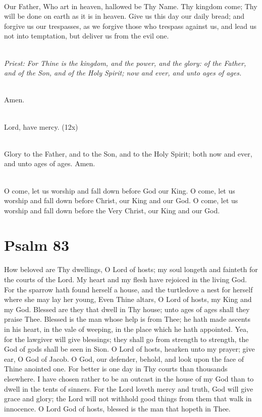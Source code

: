 {\mbox{}\\
Our Father, Who art in heaven, hallowed be Thy Name. Thy kingdom come; 
Thy will be done on earth as it is in heaven.
Give us this day our daily bread; 
and forgive us our trespasses,
as we forgive those who trespass against us, and 
lead us not into temptation, but deliver us from the evil one. 

\mbox{}\\
\emph{Priest: For Thine is the kingdom, and the power,
and the glory: of the Father, and of 
the Son, and of the Holy Spirit; now and ever, and unto ages of ages.}

\mbox{}\\
Amen.

\mbox{}\\
Lord, have mercy. (12x)

\mbox{}\\
Glory to the Father, and to the Son, and to the Holy Spirit;
both now and ever, 
and unto ages of ages. Amen.

\mbox{}\\ 
O come, let us worship and fall down before God our King. 
O come, let us worship and fall down before Christ, our King and our God. 
O come, let us worship and fall down before the Very Christ, our King and our 
God. 

\section*{Psalm 83} 
How beloved are Thy dwellings, O Lord of hosts;
my soul longeth and fainteth for the 
courts of the Lord. 
My heart and my flesh have rejoiced in the living God. 
For the sparrow hath found herself a house,
and the turtledove a nest for herself where 
she may lay her young, 
Even Thine altars, O Lord of hosts, my King and my God. 
Blessed are they that dwell in Thy house;
unto ages of ages shall they praise Thee. 
Blessed is the man whose help is from Thee;
he hath made ascents in his heart, in the vale 
of weeping, in the place which he hath appointed. 
Yea, for the lawgiver will give blessings;
they shall go from strength to strength, the God 
of gods shall be seen in Sion. 
O Lord of hosts, hearken unto my prayer; give ear, O God of Jacob. 
O God, our defender, behold, and look upon the face of Thine anointed one. 
For better is one day in Thy courts than thousands elsewhere. 
I have chosen rather to be an outcast in the house of my God than to dwell in 
the tents of 
sinners. 
For the Lord loveth mercy and truth,
God will give grace and glory; the Lord will not 
withhold good things from them that walk in innocence. 
O Lord God of hosts, blessed is the man that hopeth in Thee. 

}

